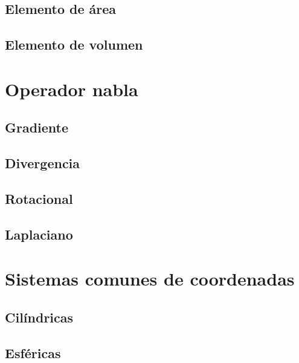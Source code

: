 \documentclass[12pt, fleqn]{report}                             %
\theoremstyle{break}                                            %
\begin{document}
            \subsection{Elemento de área}
            
            \subsection{Elemento de volumen}
            
        \section{Operador nabla}
        
            \subsection{Gradiente}
            
            \subsection{Divergencia}
            
            \subsection{Rotacional}
            
            \subsection{Laplaciano}
            
        \section{Sistemas comunes de coordenadas}
        
            \subsection{Cilíndricas}
            
            \subsection{Esféricas}
            
\end{document}
